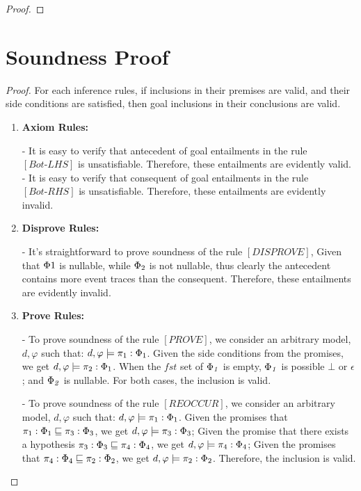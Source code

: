 \documentclass[acmsmall,10pt,review]{acmart}
\newcommand{\effect}{\textcolor{black}{\ensuremath{\mathrm{\Phi}}}}
\newcommand{\code}[1]{{\tt{\ensuremath{\m{#1}}}}}
\newcommand{\codeme}[1]{{\tt{\ensuremath{#1}}}}
\newcommand{\CONTAIN}{\sqsubseteq}
\newcommand{\m}{\mathit}
\begin{document}
{\begin{proof}
 \end{proof}


\section{Soundness Proof} 
 \label{proof:SoundnessProof}
 

 

\begin{proof}
For each inference rules, if inclusions in their premises are valid, and their side conditions are satisfied, then goal inclusions in their conclusions are valid.

\begin{enumerate}
\item \textbf{Axiom Rules:} 

- It is easy to verify that antecedent of goal entailments in the rule \codeme{[Bot\text{-}LHS]} is unsatisfiable. Therefore, these entailments are evidently valid.\\
- It is easy to verify that consequent of goal entailments in the rule \codeme{[Bot\text{-}RHS]} is unsatisfiable. Therefore, these entailments are evidently invalid.\\


\item \textbf{Disprove Rules:} 

- It's straightforward to prove soundness of the rule \codeme{[DISPROVE]}, Given that \codeme{ \effect1} is nullable, while \codeme{ \effect_2} is not nullable, thus clearly the antecedent contains more event traces than the consequent.  Therefore, these entailments are evidently invalid.\\


\item \textbf{Prove Rules:} 

- To prove soundness of the rule \code{[PROVE]}, we consider an arbitrary model, \codeme{d,  \varphi} such that:  \codeme{d,  \varphi \models  {\pi_1 : \effect_1}}. Given the side conditions from the promises, we get \codeme{d,  \varphi \models {\pi_2 : \effect_1}}. When the \code{\m{fst}} set of \code{\effect_1} is empty, \code{\effect_1} is possible \code{\bot} or \code{\epsilon}; and \code{\effect_2} is nullable. For both cases, the inclusion is valid. 

- To prove soundness of the rule \codeme{[REOCCUR]}, we consider an arbitrary model, \codeme{d,  \varphi} such that:  \codeme{d,  \varphi \models  {\pi_1 : \effect_1}}. Given the promises that  \codeme{\pi_1 : \effect_1 \CONTAIN \pi_3 : \effect_3}, we get \codeme{d,  \varphi \models {\pi_3 : \effect_3}}; Given the promise that there exists a hypothesis \codeme{\pi_3 : \effect_3 \CONTAIN  \pi_4 : \effect_4}, we get \codeme{d,  \varphi \models {\pi_4 : \effect_4}}; Given the promises that  \codeme{\pi_4 : \effect_4 \CONTAIN \pi_2 : \effect_2}, we get \codeme{d,  \varphi \models {\pi_2 : \effect_2}}. Therefore,  the inclusion is valid. 
\\



\end{enumerate}
\end{proof}}
\end{document}
